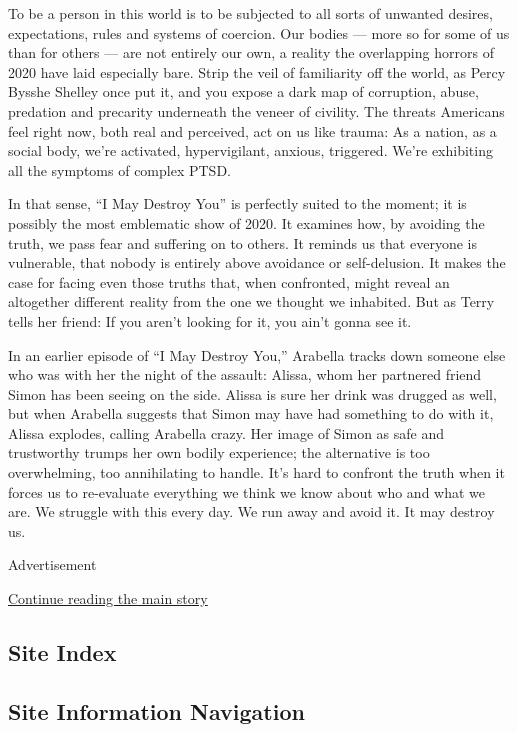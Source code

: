 To be a person in this world is to be subjected to all sorts of unwanted
desires, expectations, rules and systems of coercion. Our bodies ---
more so for some of us than for others --- are not entirely our own, a
reality the overlapping horrors of 2020 have laid especially bare. Strip
the veil of familiarity off the world, as Percy Bysshe Shelley once put
it, and you expose a dark map of corruption, abuse, predation and
precarity underneath the veneer of civility. The threats Americans feel
right now, both real and perceived, act on us like trauma: As a nation,
as a social body, we're activated, hypervigilant, anxious, triggered.
We're exhibiting all the symptoms of complex PTSD.

In that sense, ``I May Destroy You'' is perfectly suited to the moment;
it is possibly the most emblematic show of 2020. It examines how, by
avoiding the truth, we pass fear and suffering on to others. It reminds
us that everyone is vulnerable, that nobody is entirely above avoidance
or self-delusion. It makes the case for facing even those truths that,
when confronted, might reveal an altogether different reality from the
one we thought we inhabited. But as Terry tells her friend: If you
aren't looking for it, you ain't gonna see it.

In an earlier episode of ``I May Destroy You,'' Arabella tracks down
someone else who was with her the night of the assault: Alissa, whom her
partnered friend Simon has been seeing on the side. Alissa is sure her
drink was drugged as well, but when Arabella suggests that Simon may
have had something to do with it, Alissa explodes, calling Arabella
crazy. Her image of Simon as safe and trustworthy trumps her own bodily
experience; the alternative is too overwhelming, too annihilating to
handle. It's hard to confront the truth when it forces us to re-evaluate
everything we think we know about who and what we are. We struggle with
this every day. We run away and avoid it. It may destroy us.

Advertisement

\protect\hyperlink{after-bottom}{Continue reading the main story}

\hypertarget{site-index}{%
\subsection{Site Index}\label{site-index}}

\hypertarget{site-information-navigation}{%
\subsection{Site Information
Navigation}\label{site-information-navigation}}

